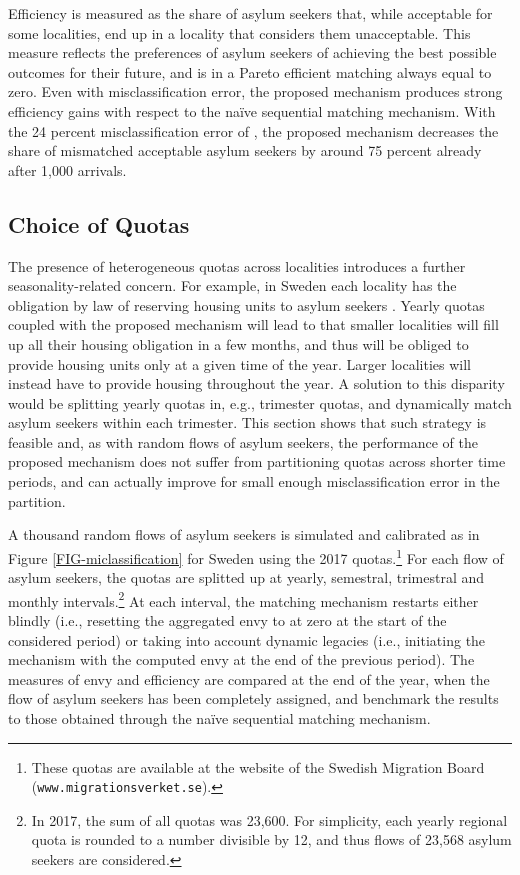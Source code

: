 \documentclass[12pt,fleqn]{article}
\begin{document}
Efficiency is measured as the share of asylum seekers that, while acceptable for some localities, end up in a locality that considers them unacceptable. This measure reflects the preferences of asylum seekers of achieving the best possible outcomes for their future, and is in a Pareto efficient matching always equal to zero. Even with misclassification error, the proposed mechanism produces strong efficiency gains with respect to the na\"{i}ve sequential matching mechanism. With the 24 percent misclassification error of \cite{bib:BansakEtAl}, the proposed mechanism decreases the share of mismatched acceptable asylum seekers by around 75 percent already after 1,000 arrivals.

\subsection{Choice of Quotas}\label{SEC:quotas}
The presence of heterogeneous quotas across localities introduces a further seasonality-related concern. For example, in Sweden each locality has the obligation by law of reserving housing units to asylum seekers \citep[Swedish Law,][]{SFS2016}. Yearly quotas coupled with the proposed mechanism will lead to that smaller localities will fill up all their housing obligation in a few months, and thus will be obliged to provide housing units only at a given time of the year. Larger localities will instead have to provide housing throughout the year. A solution to this disparity would be splitting yearly quotas in, e.g., trimester quotas, and dynamically match asylum seekers within each trimester. This section shows that such strategy is feasible and, as with random flows of asylum seekers, the performance of the proposed mechanism does not suffer from partitioning quotas across shorter time periods, and can actually improve for small enough misclassification error in the partition.

A thousand random flows of asylum seekers is simulated and calibrated as in Figure \ref{FIG-miclassification} for Sweden using the 2017 quotas.\footnote{These quotas are available at the website of the Swedish Migration Board (\texttt{www.migrationsverket.se}).} For each flow of asylum seekers, the quotas are splitted up at yearly, semestral, trimestral and monthly intervals.\footnote{In 2017, the sum of all quotas was 23,600. For simplicity, each yearly regional quota is rounded to a number divisible by 12, and thus flows of 23,568 asylum seekers are considered.} At each interval, the matching mechanism restarts either blindly (i.e., resetting the aggregated envy to at zero at the start of the considered period) or taking into account dynamic legacies (i.e., initiating the mechanism with the computed envy at the end of the previous period). The measures of envy and efficiency are compared at the end of the year, when the flow of asylum seekers has been completely assigned, and benchmark the results to those obtained through the na\"{i}ve sequential matching mechanism.
\end{document}

